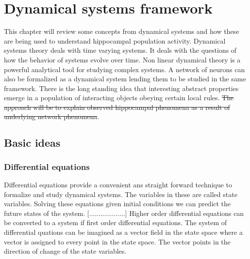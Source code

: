 
\chapter{Dynamical systems framework} %

\label{dynamics} %



This chapter will review some concepts from dynamical systems and how these are being used to understand hippocampal population activity. Dynamical systems theory deals with time varying systems. It deals with the questions of how the behavior of systems evolve over time. Non linear dynamical theory is a powerful analytical tool for studying complex systems. A network of neurons can also be formalized as a dynamical system lending  them to be studied in the same framework. There is the long standing idea that interesting abstract properties emerge in a population of interacting objects obeying certain local rules. \st{The approach will be to explain observed hippocampal phenomena as a result of underlying network phenomena}.
 
\section{Basic ideas}

\subsection{Differential equations}
Differential equations provide a convenient ans straight forward technique to formalize and study dynamical systems. The variables in these are called state variables. Solving these equations given initial conditions we can predict the future states of the system.
[...................]
Higher order differential equations can be converted to a system if first order differential equations. 
The system of differential quations can be imagined as a vector field in the state space where a vector is assigned to every point in the state space. The vector points in the direction of change of the state variables. 

